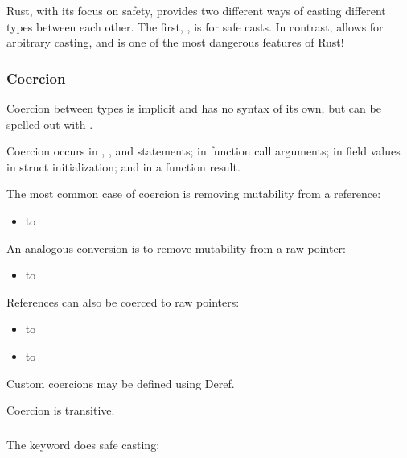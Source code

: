 Rust, with its focus on safety, provides two different ways of casting different types between each other. The first, , is 
for safe casts. In contrast,  allows for arbitrary casting, and is one of the most dangerous features of Rust!

\subsubsection*{Coercion}

Coercion between types is implicit and has no syntax of its own, but can be spelled out with .

\blank

Coercion occurs in \keylet, , and  statements; in function call arguments; in field values in struct 
initialization; and in a function result.

\blank

The most common case of coercion is removing mutability from a reference:

\begin{itemize}
  \item{ to }
\end{itemize}

An analogous conversion is to remove mutability from a raw pointer:

\begin{itemize}
  \item{ to }
\end{itemize}

References can also be coerced to raw pointers:

\begin{itemize}
  \item{ to }
  \item{ to }
\end{itemize}

Custom coercions may be defined using Deref.

\blank

Coercion is transitive.

\subsubsection*{}

The  keyword does safe casting:

